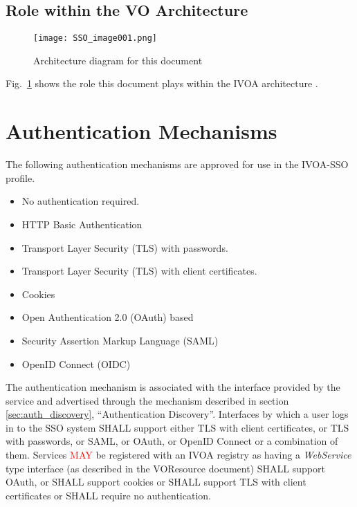 \documentclass[11pt,a4paper]{ivoa}
\begin{document}

\subsection{Role within the VO Architecture}

\begin{figure}
\centering

\texttt{[image: SSO\_image001.png]}
\caption{Architecture diagram for this document}
\label{fig:archdiag}
\end{figure}

Fig.~\ref{fig:archdiag} shows the role this document plays within the
IVOA architecture \citep{2010ivoa.rept.1123A}.

\section{Authentication Mechanisms}
\label{sec:authentication-mechanisms}

The following authentication mechanisms are approved for use in
the IVOA-SSO profile.
\begin{itemize}
\item No authentication required.
\item HTTP Basic Authentication
\item Transport Layer Security (TLS) with passwords.
\item Transport Layer Security (TLS) with client certificates.
\item Cookies
\item Open Authentication 2.0 (OAuth) based
\item Security Assertion Markup Language (SAML)
\item OpenID Connect (OIDC)
\end{itemize}

The authentication mechanism is associated with the interface provided
by the service
and advertised through the mechanism described in
section \ref{sec:auth_discovery}, ``Authentication Discovery''.
Interfaces by which a user logs in to the SSO system SHALL support
either
TLS with client certificates, or TLS with passwords, or SAML,
or OAuth, or OpenID Connect or a combination of them.
Services \textcolor{red}{MAY} be registered with an IVOA registry
as having a {\em WebService} type interface (as
described in the VOResource document) SHALL support OAuth, or SHALL
support cookies or SHALL support TLS with client
certificates or SHALL require no authentication.
\end{document}

